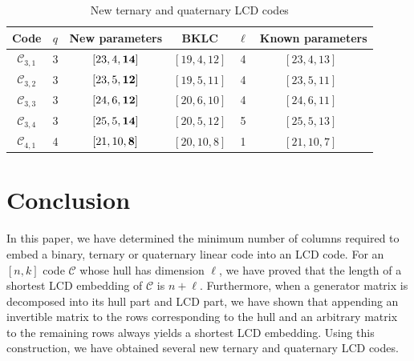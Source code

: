 \documentclass{article}
\theoremstyle{definition}
\theoremstyle{remark}
\begin{document}
\begin{table}[ht]

\centering

\small

\begin{tabular}{c|c|c|c|c||c}

Code & $q$ & New parameters & BKLC & $\ell$  & Known parameters\\

\hline

$\mathcal{C}_{3, 1}$ & 3 & $[23, 4, {\bf{14}}]$ & $[19, 4, 12]$ & 4 & $[23, 4, 13]$~\cite{Li-optimal-LCD-2024-1}\\

$\mathcal{C}_{3, 2}$ & 3 & $[23, 5, {\bf{12}}]$ & $[19, 5, 11]$ & 4 & $[23, 5, 11]$~\cite{Li-optimal-LCD-2024-1}\\

$\mathcal{C}_{3, 3}$ & 3 & $[24, 6, {\bf{12}}]$ & $[20, 6, 10]$ & 4 & $[24, 6, 11]$~\cite{Li-optimal-LCD-2024-1}\\

$\mathcal{C}_{3, 4}$ & 3 & $[25, 5, {\bf{14}}]$ & $[20, 5, 12]$ & 5 & $[25, 5, 13]$~\cite{Li-optimal-LCD-2024-1}\\

$\mathcal{C}_{4, 1}$ & 4 & $[21, 10, {\bf{8}}]$ & $[20, 10, 8]$ & 1 & $[21, 10, 7]$~\cite{Lu-quaternary-LCD}\\

\end{tabular}

\caption{New ternary and quaternary LCD codes}
\label{tab:LCD_table-2}
\end{table}


\section{Conclusion}

In this paper, we have determined the minimum number of columns required to embed a binary, ternary or quaternary linear code into an LCD code. For an $[n, k]$ code $\mathcal{C}$ whose hull has dimension $\ell$, we have proved that the length of a shortest LCD embedding of $\mathcal{C}$ is $n+\ell$. Furthermore, when a generator matrix is decomposed into its hull part and LCD part, we have shown that appending an invertible matrix to the rows corresponding to the hull and an arbitrary matrix to the remaining rows always yields a shortest LCD embedding. Using this construction, we have obtained several new ternary and quaternary LCD codes. 
\end{document}
